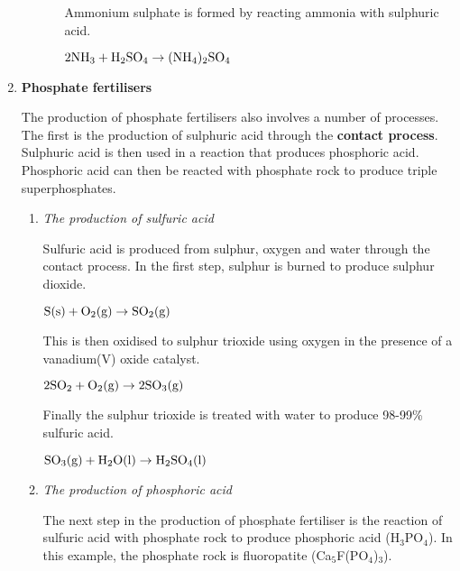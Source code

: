 \begin{enumerate}
\begin{enumerate}
\begin{itemize}
{Ammonium sulphate is formed by reacting ammonia with sulphuric acid.

\begin{center}
$\rm{2NH_{3} + H_{2}SO_{4} \rightarrow (NH_{4})_{2}SO_{4}}$
\end{center}

}
\end{itemize}
 
	\end{enumerate}

\item{\textbf{Phosphate fertilisers}}

The production of phosphate fertilisers also involves a number of processes. The first is the production of sulphuric acid through the \textbf{contact process}. Sulphuric acid is then used in a reaction that produces phosphoric acid. Phosphoric acid can then be reacted with phosphate rock to produce triple superphosphates. 

	\begin{enumerate}
\item{\textit{The production of sulfuric acid}}

Sulfuric acid is produced from sulphur, oxygen and water through the contact process. In the first step, sulphur is burned to produce sulphur dioxide.

\begin{center}
$\rm{S(s) + O_{2}(g) \rightarrow SO_{2}(g)}$
\end{center}
 
This is then oxidised to sulphur trioxide using oxygen in the presence of a vanadium(V) oxide catalyst.

\begin{center}
$\rm{2SO_{2} + O_{2}(g) \rightarrow 2SO_{3}(g)}$
\end{center} 

Finally the sulphur trioxide is treated with water to produce 98-99\% sulfuric acid.

\begin{center}
$\rm{SO_{3}(g) + H_{2}O(l) \rightarrow H_{2}SO_{4}(l)}$
\end{center}

\item{\textit{The production of phosphoric acid}}

The next step in the production of phosphate fertiliser is the reaction of sulfuric acid with phosphate rock to produce phosphoric acid (H$_{3}$PO$_{4}$). In this example, the phosphate rock is fluoropatite (Ca$_{5}$F(PO$_{4}$)$_{3}$). 


\end{enumerate}
\end{enumerate}
